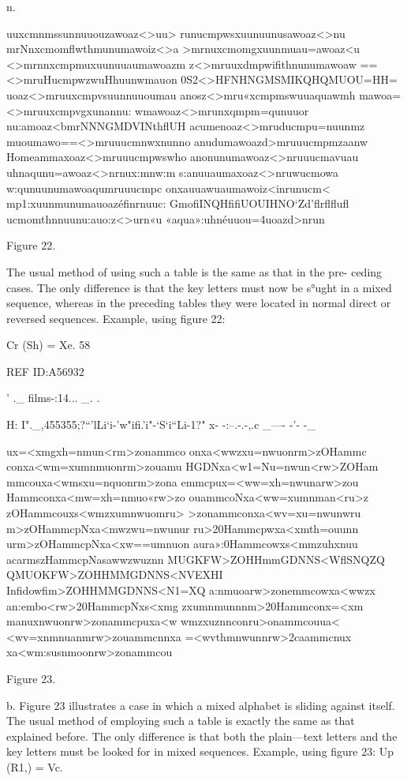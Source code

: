 {{{n.

uuxcmnmssunnuuouzawoaz<>uu>
runucmpwsxuunuunusawoaz<>nu
mrNnxcmomﬂwthmunumawoiz<>a
>mrnuxcmomgxuunmuau=awoaz<u
<>mrnnxcmpmuxuunuuaumawoazm
z<>mruuxdmpwiﬁthnunumawoaw
==<>mruHucmpwzwuHhuunwmauon
0S2<>HFNHNGMSMIKQHQMUOU=HH=
uoaz<>mruuxcmpvsuunnuuoumau
anosz<>mru«xcmpmswuuaquawmh
mawoa=<>mruuxcmpvgxunannu:
wmawoaz<>mrunxqmpm=qunuuor
nu:amoaz<bmrNNNGMDVINthﬂUH
acumenoaz<>mruducmpu=nuunmz
muoumawo==<>mruuucmnwxnunno
anudumawoazd>mruuucmpmzaanw
Homeammaxoaz<>mruuucmpwswho
anonunumawoaz<>nruuucmavuau
uhnaqunu=awoaz<>nrnux:mnw:m
s:anuuaumaxoaz<>nruwucmowa
w:qunuunumawoaqumruuucmpc
onxauuawuaumawoiz<inrunucm<
mp1:xuunmunumauoazéﬁnrnuuc:
GmoﬁINQHﬁﬁUOUIHNO‘Zd’ﬂrﬂﬂuﬂ
ucmomthnnuunu:auo:z<>urn«u
«aqua»:uhnéuuou=4uoazd>nrun

Figure 22.

The usual method of using such a table is the same as that in the pre-
ceding cases. The only difference is that the key letters must now be
s°ught in a mixed sequence, whereas in the preceding tables they were
located in normal direct or reversed sequences. Example, using ﬁgure 22:

Cr (Sh) = Xe.
58

 

 

 

REF ID:A56932

 

' ._ ﬁlms-:14... _. .

H: I"._,455355;?“'lLi‘i-'w"ifi.'i"-‘S‘i“Li-1?" x- -:--.-.-,.c _---- -'- -_

ux=<xmgxh=nmun<rm>zonammco
onxa<wwzxu=nwuonrm>zOHammc
conxa<wm=xumnmuonrm>zouamu
HGDNxa<w1=Nu=nwun<rw>ZOHam
mmcouxa<wmsxu=nquonrm>zona
emmcpux=<ww=xh=nwunarw>zou
Hammconxa<mw=xh=nmuo«rw>zo
ouammcoNxa<ww=xumnman<ru>z
zOHammcouxs<wmzxumnwuomru>
>zonammconxa<wv=xu=nwunwru
m>zOHammcpNxa<mwzwu=nwunur
ru>20Hammcpwxa<xmth=ouunn
urm>zOHammcpNxa<xw==umnuon
aura»:0Hammcowxs<mmzuhxnuu
acarmszHammcpNasawwzwuznn
MUGKFW>ZOHHmmGDNNS<WﬂSNQZQ
QMUOKFW>ZOHHMMGDNNS<NVEXHI
Inﬁdowﬁm>ZOHHMMGDNNS<N1=XQ
a:nmuoarw>zonemmcowxa<wwzx
an:embo<rw>20HammcpNxs<xmg
zxumnmunnnm>20Hammconx=<xm
manuxnwuonrw>zonammcpuxa<w
wmzxuznnconru>onammcouua<
<wv=xnmnuanmrw>zouammcnnxa
=<wvthmnwunnrw>2caammcnux
xa<wm:susnmoonrw>zonammcou

Figure 23.

b. Figure 23 illustrates a case in which a mixed alphabet is sliding
against itself. The usual method of employing such a table is exactly
the same as that explained before. The only difference is that both the
plain—text letters and the key letters must be looked for in mixed
sequences. Example, using ﬁgure 23: Up (R1,) = Vc.

}}}
